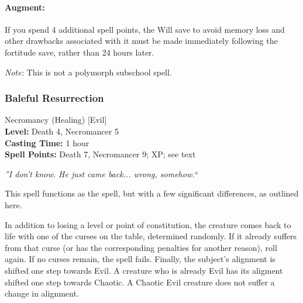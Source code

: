 \paragraph{Augment:} If you spend 4 additional spell points, the Will save to avoid memory loss and other drawbacks associated with it must be made immediately following the fortitude save, 
rather than 24 hours later.

\emph{Note:} This is not a polymorph subschool spell.
\subsubsection{Baleful Resurrection}
\label{Spell:BalefulResurrection}
Necromancy (Healing) [Evil]
\\ \textbf{Level:} Death 4, Necromancer 5
\\ \textbf{Casting Time:} 1 hour
\\ \textbf{Spell Points:} Death 7, Necromancer 9; XP; see text

\emph{''I don't know. He just came back... wrong, somehow.``}

This spell functions as the  spell, but with a few significant differences, as outlined here.

In addition to losing a level or point of constitution, the creature comes back to life with one of the curses on the  table, determined randomly. If it already suffers from that curse (or has the corresponding penalties for another reason), roll again. If no curses remain, the spell fails. Finally, the subject's alignment is shifted one step towards Evil. A creature who is already Evil has its aligment shifted one step towards Chaotic. A Chaotic Evil creature does not suffer a change in alignment.


